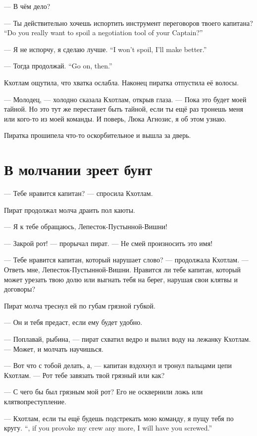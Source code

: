 --- В чём дело?

{--- Ты действительно хочешь испортить инструмент переговоров твоего капитана?}
{``Do you really want to spoil a negotiation tool of your Captain?''}

{--- Я не испорчу, я сделаю лучше.}
{``I won't spoil, I'll make better.''}

{--- Тогда продолжай.}
{``Go on, then.''}

Кхотлам ощутила, что хватка ослабла.
Наконец пиратка отпустила её волосы.

--- Молодец, --- холодно сказала Кхотлам, открыв глаза.
--- Пока это будет моей тайной.
Но это тут же перестанет быть тайной, если ты ещё раз тронешь меня или кого-то из моей команды.
И поверь, Люка Агнозис, я об этом узнаю.

Пиратка прошипела что-то оскорбительное и вышла за дверь.

\section{В молчании зреет бунт}

--- Тебе нравится капитан? --- спросила Кхотлам.

Пират продолжал молча драить пол каюты.

--- Я к тебе обращаюсь, Лепесток-Пустынной-Вишни!

--- Закрой рот! --- прорычал пират.
--- Не смей произносить это имя!

--- Тебе нравится капитан, который нарушает слово? --- продолжала Кхотлам.
--- Ответь мне, Лепесток-Пустынной-Вишни.
Нравится ли тебе капитан, который может урезать твою долю или выгнать тебя на берег, нарушая свои клятвы и договоры?

Пират молча треснул ей по губам грязной губкой.

--- Он и тебя предаст, если ему будет удобно.

--- Поплавай, рыбина, --- пират схватил ведро и вылил воду на лежанку Кхотлам.
--- Может, и молчать научишься.

\asterism

--- Вот что с тобой делать, а, --- капитан вздохнул и тронул пальцами цепи Кхотлам.
--- Рот тебе завязать твой грязный или как?

--- С чего бы был грязным мой рот?
Его не осквернили ложь или клятвопреступление.

{--- Кхотлам, если ты ещё будешь подстрекать мою команду, я пущу тебя по кругу.}
{``\Kchotlam, if you provoke my crew any more, I will have you screwed.''}


